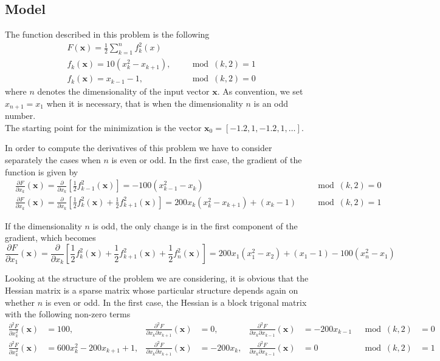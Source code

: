 \subsection*{Model}
The function described in this problem is the following
\begin{equation*}
    \begin{aligned}
    & F(\mathbf{x}) = \frac{1}{2} \sum_{k=1}^{n} f_k^2(x) \\
    & f_k(\mathbf{x}) = 10 \left(x_k^2 - x_{k+1}\right), \quad  & \mod (k,2) = 1\\   
    & f_k(\mathbf{x}) = x_{k-1} -1, \quad & \mod(k,2) = 0
    \end{aligned}
\end{equation*}
where $n$ denotes the dimensionality of the input vector $\mathbf{x}$. As convention, we set $x_{n+1} = x_1$ when it is necessary, that is when the dimensionality $n$ is an odd number.
\\ The starting point for the minimization is the vector $\mathbf{x}_0 = [-1.2, 1, -1.2, 1, \ldots]$.

In order to compute the derivatives of this problem we have to consider separately the cases when $n$ is even or odd. In the first case, the gradient of the function is given by
\begin{align*}
    &\frac{\partial F}{\partial x_k} (\mathbf{x}) = \frac{\partial}{\partial x_k} \left[\frac{1}{2} f_{k-1}^2(\mathbf{x})\right] = - 100 (x_{k-1}^2 - x_k) \quad & \mod(k,2) = 0 \\
    & \frac{\partial F}{\partial x_k} (\mathbf{x}) = \frac{\partial}{\partial x_k} \left[\frac{1}{2} f_{k}^2(\mathbf{x}) + \frac{1}{2} f_{k+1}^2(\mathbf{x})\right] = 200x_k (x_k^2 - x_{k+1}) + (x_k -1)\quad & \mod(k,2) = 1
\end{align*}

If the dimensionality $n$ is odd, the only change is in the first component of the gradient, which becomes
$$ \frac{\partial F}{\partial x_1} (\mathbf{x})  = \frac{\partial}{\partial x_k} \left[\frac{1}{2} f_{k}^2(\mathbf{x}) + \frac{1}{2} f_{k+1}^2(\mathbf{x}) + \frac{1}{2}f_n^2(\mathbf{x}) \right] = 200x_1 (x_1^2 - x_{2}) + (x_1 -1)  - 100(x_n^2 - x_1)$$

Looking at the structure of the problem we are considering, it is obvious that the Hessian matrix is a sparse matrix whose particular structure depends again on whether $n$ is even or odd. In the first case, the Hessian is a block trigonal matrix with the following non-zero terms
\begin{align*}
    \frac{\partial^2 F}{\partial x_k^2} (\mathbf{x}) &= 100, & \frac{\partial^2 F}{\partial x_k \partial x_{k+1}} (\mathbf{x}) &= 0, & \frac{\partial^2 F}{\partial x_k \partial x_{k-1}} (\mathbf{x}) &= -200x_{k-1} & \mod(k,2) &= 0 \\
    \frac{\partial^2 F}{\partial x_k^2} (\mathbf{x}) &= 600x_k^2 - 200x_{k+1} + 1, & \frac{\partial^2 F}{\partial x_k \partial x_{k+1}} (\mathbf{x}) &= -200x_k, & \frac{\partial^2 F}{\partial x_k \partial x_{k-1}} (\mathbf{x}) &= 0 & \mod(k,2) &= 1 \\
\end{align*}

